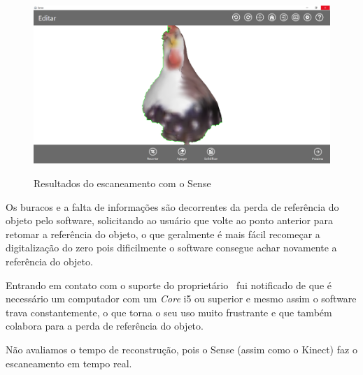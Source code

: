 \newpage

\begin{figure}[!h]
	\centering
	\caption{Resultados do escaneamento com o Sense}
	\includegraphics[width=0.9\linewidth]{figs/sense8v2.png}
		\label{fig:sense3}
\end{figure} 


Os buracos e a falta de informações são decorrentes da perda de referência do objeto pelo software, solicitando ao usuário que volte ao ponto anterior para retomar a referência do objeto, o que geralmente é mais fácil recomeçar a digitalização do zero pois dificilmente o software consegue achar novamente a referência do objeto. 

Entrando em contato com o suporte do proprietário~\cite{3DSystems} fui notificado de que é necessário um computador com um \emph{Core} i5 ou superior e mesmo assim o software trava constantemente, o que torna o seu uso muito frustrante e que também colabora para a perda de referência do objeto.


%
%
%

Não avaliamos o tempo de reconstrução, pois o Sense (assim como o Kinect) faz o escaneamento em tempo real.